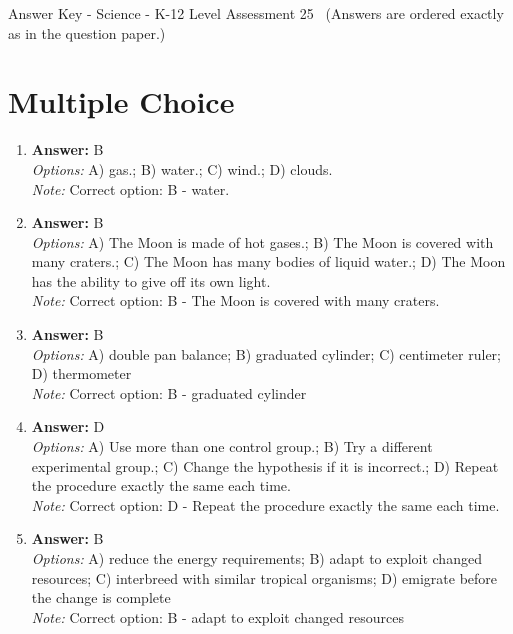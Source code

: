 \documentclass[12pt]{article}
\begin{document}
\begin{center}
Answer Key - Science - K-12 Level Assessment 25 \
\small (Answers are ordered exactly as in the question paper.)
\end{center}

\section*{Multiple Choice}
\begin{enumerate}[label=\arabic*.]
\item \textbf{Answer:} B
\\ \textit{Options:} A) gas.; B) water.; C) wind.; D) clouds.
\\ \textit{Note:} Correct option: B - water.
\item \textbf{Answer:} B
\\ \textit{Options:} A) The Moon is made of hot gases.; B) The Moon is covered with many craters.; C) The Moon has many bodies of liquid water.; D) The Moon has the ability to give off its own light.
\\ \textit{Note:} Correct option: B - The Moon is covered with many craters.
\item \textbf{Answer:} B
\\ \textit{Options:} A) double pan balance; B) graduated cylinder; C) centimeter ruler; D) thermometer
\\ \textit{Note:} Correct option: B - graduated cylinder
\item \textbf{Answer:} D
\\ \textit{Options:} A) Use more than one control group.; B) Try a different experimental group.; C) Change the hypothesis if it is incorrect.; D) Repeat the procedure exactly the same each time.
\\ \textit{Note:} Correct option: D - Repeat the procedure exactly the same each time.
\item \textbf{Answer:} B
\\ \textit{Options:} A) reduce the energy requirements; B) adapt to exploit changed resources; C) interbreed with similar tropical organisms; D) emigrate before the change is complete
\\ \textit{Note:} Correct option: B - adapt to exploit changed resources
\end{enumerate}
\end{document}
